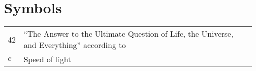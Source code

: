 \documentclass[master=elt,masteroption=eg,english]{kulemt}
\begin{document}
\section*{Symbols}
\begin{flushleft}
  \renewcommand{\arraystretch}{1.1}
  \begin{tabularx}{\textwidth}{@{}p{12mm}X@{}}
    42    & ``The Answer to the Ultimate Question of Life, the Universe,
            and Everything'' according to \cite{h2g2} \\
    $c$   & Speed of light \\
    
  \end{tabularx}
\end{flushleft}

\mainmatter










\appendixpage*          %
\appendix



\backmatter


%
\end{document}
